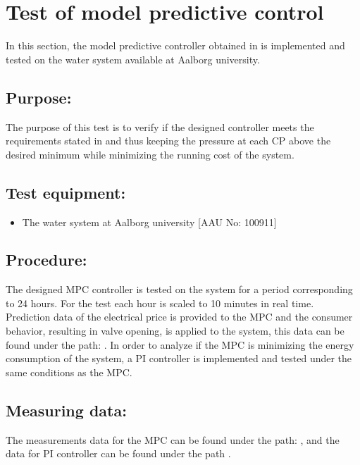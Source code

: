 \section{Test of model predictive control}
\label{sec:MPT_test}

In this section, the model predictive controller obtained in  is implemented and tested on the water system available at Aalborg university. 

\subsection*{Purpose:}

The purpose of this test is to verify if the designed controller meets the requirements stated in  and thus keeping the pressure at each CP above the desired minimum while minimizing the running cost of the system.

\subsection*{Test equipment:}
\begin{itemize}
\item The water system at Aalborg university [AAU No: 100911]
\end{itemize}

\subsection*{Procedure:}
The designed MPC controller is tested on the system for a period corresponding to 24 hours. For the test each hour is scaled to 10 minutes in real time. Prediction data of the electrical price is provided to the MPC and the consumer behavior, resulting in valve opening, is applied to the system, this data can be found under the path: . 
In order to analyze if the MPC is minimizing the energy consumption of the system, a PI controller is implemented and tested under the same conditions as the MPC.    

\subsection*{Measuring data:}
The measurements data for the MPC can be found under the path: , and the data for PI controller can be found under the path . 


